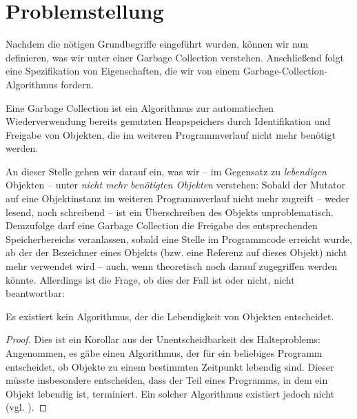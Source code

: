 \section{Problemstellung}
\label{sec:intro:problem}
Nachdem die nötigen Grundbegriffe eingeführt wurden, können wir nun definieren, was wir unter einer Garbage Collection verstehen.
Anschließend folgt eine Spezifikation von Eigenschaften, die wir von einem Garbage-Collection-Algorithmus fordern.

\begin{mybox}
\begin{defn}
	Eine Garbage Collection ist ein Algorithmus zur automatischen Wiederverwendung bereits genutzten Heapspeichers durch Identifikation und Freigabe von Objekten, die im weiteren Programmverlauf nicht mehr benötigt werden.
\end{defn}
\end{mybox}

An dieser Stelle gehen wir darauf ein, was wir -- im Gegensatz zu \textit{lebendigen} Objekten -- unter \textit{nicht mehr benötigten Objekten} verstehen:
Sobald der Mutator auf eine Objektinstanz im weiteren Programmverlauf nicht mehr zugreift -- weder lesend, noch schreibend -- ist ein Überschreiben des Objekts unproblematisch.
Demzufolge darf eine Garbage Collection die Freigabe des entsprechenden Speicherbereichs veranlassen, sobald eine Stelle im Programmcode erreicht wurde, ab der der Bezeichner eines Objekts (bzw. eine Referenz auf dieses Objekt) nicht mehr verwendet wird -- auch, wenn theoretisch noch darauf zugegriffen werden könnte.
Allerdings ist die Frage, ob dies der Fall ist oder nicht, nicht beantwortbar:

\begin{mybox}
\begin{satz}
	Es existiert kein Algorithmus, der die Lebendigkeit von Objekten entscheidet.
\end{satz}
\end{mybox}

\begin{proof}
	Dies ist ein Korollar aus der Unentscheidbarkeit des Halteproblems:
	Angenommen, es gäbe einen Algorithmus, der für ein beliebiges Programm entscheidet, ob Objekte zu einem bestimmten Zeitpunkt lebendig sind.
	Dieser müsste insbesondere entscheiden, dass der Teil eines Programms, in dem ein Objekt lebendig ist, terminiert.
	Ein solcher Algorithmus existiert jedoch nicht (vgl. \cite[Kap. 4.2]{sipser}).
\end{proof}


